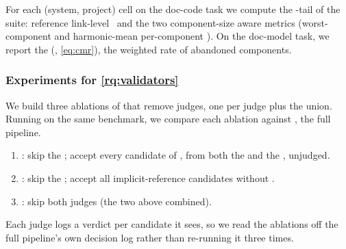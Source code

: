 For each (system, project) cell on the doc-code task we compute the \fone-tail of the suite: reference link-level \fone\ and the two component-size aware metrics (worst-component and harmonic-mean per-component \fone).
On the doc-model task, we report the \cmrname{} (\cmr, \autoref{eq:cmr}), the weighted rate of abandoned components.

\subsubsection{Experiments for \ref{rq:validators}}
\label{sec:exp:rq3}
We build three ablations of \approach{} that remove judges, one per judge plus the union.
Running on the same benchmark, we compare each ablation against \emph{\fullVariant{}}, the full pipeline.

\begin{enumerate}[leftmargin=*]
\item \emph{\noNameValid{}}: skip the \nameValidator{}; accept every candidate of \linkerN{}, from both the \linkerB{} and the \linkerD{}, unjudged.

\item \emph{\noCitation{}}: skip the \corefValidator{}; accept all implicit-reference candidates without \corefValidator{}.

\item \emph{\noValidator{}}: skip both judges (the two above combined).
\end{enumerate}
Each judge logs a verdict per candidate it sees, so we read the ablations off the full pipeline's own decision log rather than re-running it three times.



